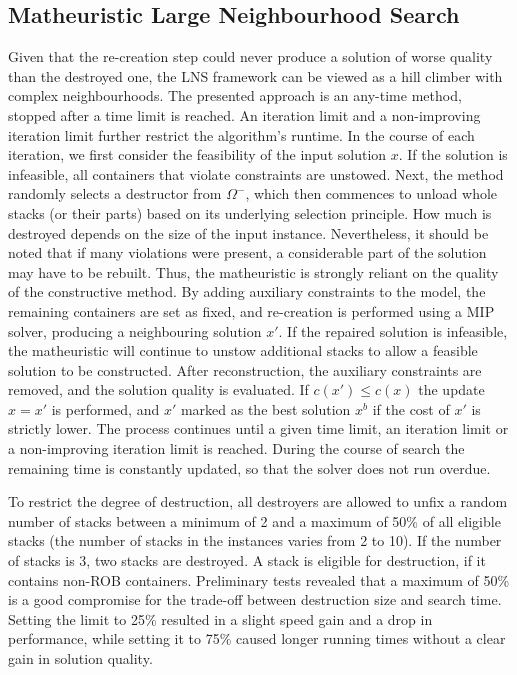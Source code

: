 \documentclass[preprint,12pt,3p]{elsarticle}
\begin{document}
\subsection{Matheuristic Large Neighbourhood Search}
Given that the re-creation step could never produce a solution of worse quality than the destroyed one, the LNS framework can be viewed as a hill climber with complex neighbourhoods. The presented approach is an any-time method, stopped after a time limit is reached. An iteration limit and a non-improving iteration limit further restrict the algorithm's runtime. In the course of each iteration, we first consider the feasibility of the input solution $x$. If the solution is infeasible, all containers that violate constraints are unstowed. Next, the method randomly selects a destructor from $\Omega^{-}$, which then commences to unload whole stacks (or their parts) based on its underlying selection principle. How much is destroyed depends on the size of the input instance. Nevertheless, it should be noted that if many violations were present, a considerable part of the solution may have to be rebuilt. Thus, the matheuristic is strongly reliant on the quality of the constructive method. By adding auxiliary constraints to the model, the remaining containers are set as fixed, and re-creation is performed using a MIP solver, producing a neighbouring solution $x'$. If the repaired solution is infeasible, the matheuristic will continue to unstow additional stacks to allow a feasible solution to be constructed. After reconstruction, the auxiliary constraints are removed, and the solution quality is evaluated. If $c(x') \leq c(x)$ the update $x = x'$ is performed, and $x'$ marked as the best solution $x^b$ if the cost of $x'$ is strictly lower. The process continues until a given time limit, an iteration limit or a non-improving iteration limit is reached. During the course of search the remaining time is constantly updated, so that the solver does not run overdue.

To restrict the degree of destruction, all destroyers are allowed to unfix a random number of stacks between a minimum of 2 and a maximum of 50\% of all eligible stacks (the number of stacks in the instances varies from 2 to 10). If the number of stacks is 3, two stacks are destroyed. A stack is eligible for destruction, if it contains non-ROB containers. Preliminary tests revealed that a maximum of 50\% is a good compromise for the trade-off between destruction size and search time. Setting the limit to 25\% resulted in a slight speed gain and a drop in performance, while setting it to 75\% caused longer running times without a clear gain in solution quality.
\end{document}
